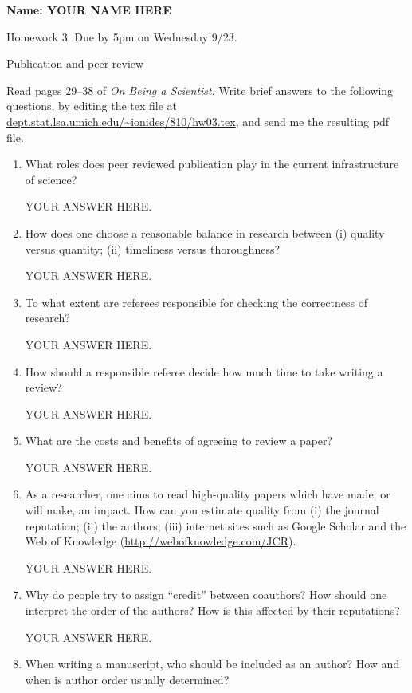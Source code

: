 \documentclass[12pt]{article}
\begin{document}
\begin{center}\bf
Name: YOUR NAME HERE

Homework 3. Due by 5pm on Wednesday 9/23.

Publication and peer review

\end{center}

Read pages 29--38 of {\em On Being a Scientist}. Write brief answers to the following questions, by editing the tex file at \url{dept.stat.lsa.umich.edu/~ionides/810/hw03.tex}, and send me the resulting pdf file. 

\begin{enumerate}
\item What roles does peer reviewed publication play in the current infrastructure of science? 

YOUR ANSWER HERE.

\item How does one choose a reasonable balance in research between (i) quality versus quantity; (ii) timeliness versus thoroughness?

YOUR ANSWER HERE.

\item To what extent are referees responsible for checking the correctness of research? 

YOUR ANSWER HERE.

\item How should a responsible referee decide how much time to take writing a review? 

YOUR ANSWER HERE.

\item What are the costs and benefits of agreeing to review a paper?

YOUR ANSWER HERE.

\item As a researcher, one aims to read high-quality papers which have made, or will make, an impact. How can you estimate quality from (i) the journal reputation; (ii) the authors; (iii) internet sites such as Google Scholar and the Web of Knowledge (\url{http://webofknowledge.com/JCR}).

YOUR ANSWER HERE.

\item Why do people try to assign ``credit'' between coauthors? How should one interpret the order of the authors? How is this affected by their reputations? 

YOUR ANSWER HERE.

\item When writing a manuscript, who should be included as an author? How and when is author order usually determined? 


\end{enumerate}
\end{document}
